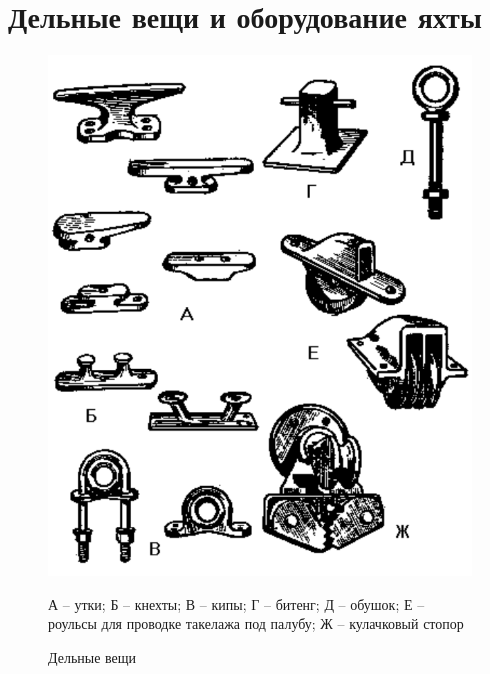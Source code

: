 \documentclass[a4paper, 12pt, twoside, final]{scrbook}
\begin{document}
%
%

\section{Дельные вещи и оборудование яхты}


\begin{figure}[htbp]
\begin{centering}
\includegraphics{50_Delnye_veshi}
\par\end{centering}

\protect\caption{\label{fig:50}Дельные вещи}

\begin{centering} \small
А \--- утки; Б \--- кнехты; В \--- кипы; Г \--- битенг; Д \--- обушок; Е \--- роульсы для проводке такелажа под палубу; Ж \--- кулачковый стопор
\par\end{centering}

\end{figure}
\end{document}
